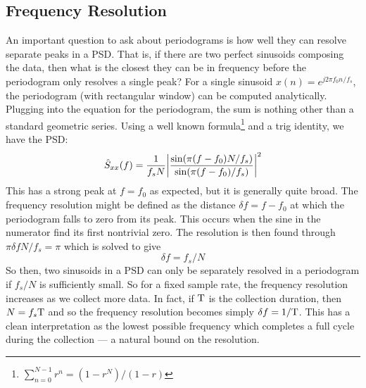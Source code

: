 \documentclass[twocolumn]{gwclass}
\begin{document}
\subsection{Frequency Resolution}
An important question to ask about periodograms is how well they can resolve separate peaks in a PSD. That is, if there are two perfect sinusoids composing the data, then what is the closest they can be in frequency before the periodogram only resolves a single peak? For a single sinusoid $x(n)=e^{j2\pi f_0 n/f_s}$, the periodogram (with rectangular window) can be computed analytically. Plugging into the equation for the periodogram, the sum is nothing other than a standard geometric series. Using a well known formula\footnote{$\sum_{n=0}^{N-1}r^n = (1-r^N)/(1-r)$} and a trig identity, we have the PSD:
$$ \hat{S}_{xx}(f) = \frac{1}{f_sN}\abs{\frac{\sin(\pi(f-f_0)N/f_s)}{\sin(\pi(f-f_0)/f_s)}}^2 $$
This has a strong peak at $f=f_0$ as expected, but it is generally quite broad. The frequency resolution might be defined as the distance $\delta f= f-f_0$ at which the periodogram falls to zero from its peak. This occurs when the sine in the numerator find its first nontrivial zero. The resolution is then found through $\pi\delta f N/f_s = \pi$ which is solved to give
$$ \delta f = f_s/N $$
So then, two sinusoids in a PSD can only be separately resolved in a periodogram if $f_s/N$ is sufficiently small. So for a fixed sample rate, the frequency resolution increases as we collect more data. In fact, if $\text{\normalfont{T}}$ is the collection duration, then $N=f_s\text{\normalfont{T}}$ and so the frequency resolution becomes simply $\delta f = 1/\text{\normalfont{T}}$. This has a clean interpretation as the lowest possible frequency which completes a full cycle during the collection --- a natural bound on the resolution.
\end{document}
